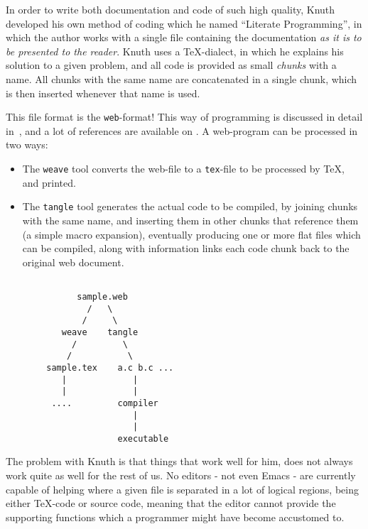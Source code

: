 In order to write both documentation and code of such high quality,
Knuth developed his own method of coding which he named ``Literate
Programming'', in which the author works with a single file containing
the documentation \textit{as it is to be presented to the
  reader}.  Knuth uses a {\TeX}-dialect, in which he
explains his solution to a given problem, and all code is
provided as small \textit{chunks} with a name.   All chunks
with the same name are concatenated in a single chunk, which
is then inserted whenever that name is used.

This file format is the \texttt{web}-format!  This way of
programming is discussed in detail
in~\cite{sewell:weaving-a-program}, and a lot of references
are available on
.
A web-program can be processed in two ways:

\begin{itemize}
\item
The \texttt{weave} tool converts the web-file to a \texttt{tex}-file
to be processed by {\TeX}, and printed.

\item The \texttt{tangle} tool generates the actual code to be
compiled, by joining chunks with the same name, and inserting them in
other chunks that reference them (a simple macro expansion),
eventually producing one or more flat files which can be compiled,
along with information links each code chunk back to the original web document.

\end{itemize}

\begin{verbatim}

              sample.web
                /   \
               /     \
           weave    tangle
             /         \
            /           \
        sample.tex    a.c b.c ...
           |             |
           |             |
         ....         compiler
                         |
                         |
                      executable
\end{verbatim}

The problem with Knuth is that things that work well for him, does not
always work quite as well for the rest of us.  No editors - not even
Emacs - are currently capable of helping where a given file is
separated in a lot of logical regions, being either {\TeX}-code or
source code, meaning that the editor cannot provide the supporting
functions which a programmer might have become accustomed to.

